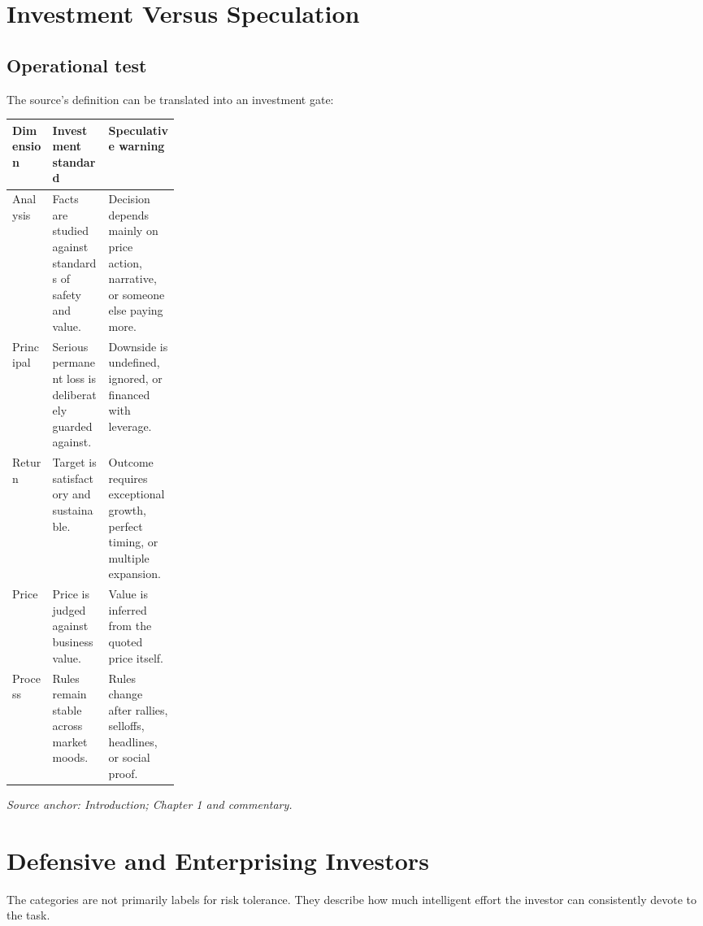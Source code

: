 \documentclass[11pt]{article}
\newcommand{\sourceRef}[1]{\textit{Source anchor: #1}}
\begin{document}
\section{Investment Versus Speculation}
\subsection{Operational test}
The source's definition can be translated into an investment gate:
\begin{center}
\begin{tabularx}{\linewidth}{@{}p{0.24\linewidth}Y Y@{}}
\toprule
\textbf{Dimension} & \textbf{Investment standard} & \textbf{Speculative warning}\tabularnewline
\midrule
Analysis & Facts are studied against standards of safety and value. & Decision depends mainly on price action, narrative, or someone else paying more.\\
Principal & Serious permanent loss is deliberately guarded against. & Downside is undefined, ignored, or financed with leverage.\\
Return & Target is satisfactory and sustainable. & Outcome requires exceptional growth, perfect timing, or multiple expansion.\\
Price & Price is judged against business value. & Value is inferred from the quoted price itself.\\
Process & Rules remain stable across market moods. & Rules change after rallies, selloffs, headlines, or social proof.\\
\bottomrule
\end{tabularx}
\end{center}
\sourceRef{Introduction; Chapter 1 and commentary.}

\section{Defensive and Enterprising Investors}
The categories are not primarily labels for risk tolerance. They describe how much intelligent effort the investor can consistently devote to the task.
\end{document}
